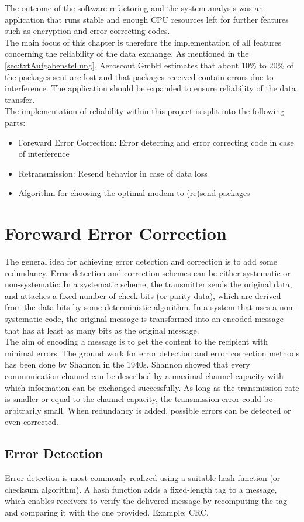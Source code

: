 %
The outcome of the software refactoring and the system analysis was an application that runs stable and enough CPU resources left for further features such as encryption and error correcting codes.\\
The main focus of this chapter is therefore the implementation of all features concerning the reliability of the data exchange. As mentioned in the \autoref{sec:txtAufgabenstellung}, Aeroscout GmbH estimates that about 10\% to 20\% of the packages sent are lost and that packages received contain errors due to interference. The application should be expanded to ensure reliability of the data transfer.\\
The implementation of reliability within this project is split into the following parts:
\begin{itemize}
    \item Foreward Error Correction: Error detecting and error correcting code in case of interference
    \item Retransmission: Resend behavior in case of data loss
    \item Algorithm for choosing the optimal modem to (re)send packages
\end{itemize}
%
%
%
%
%
\section{Foreward Error Correction}
The general idea for achieving error detection and correction is to add some redundancy. Error-detection and correction schemes can be either systematic or non-systematic: In a systematic scheme, the transmitter sends the original data, and attaches a fixed number of check bits (or parity data), which are derived from the data bits by some deterministic algorithm. In a system that uses a non-systematic code, the original message is transformed into an encoded message that has at least as many bits as the original message.\\
The aim of encoding a message is to get the content to the recipient with minimal errors. The ground work for error detection and error correction methods has been done by Shannon in the 1940s. Shannon showed that every communication channel can be described by a maximal channel capacity with which information can be exchanged successfully. As long as the transmission rate is smaller or equal to the channel capacity, the transmission error could be arbitrarily small. When redundancy is added, possible errors can be detected or even corrected.
%
%
\subsection{Error Detection}
Error detection is most commonly realized using a suitable hash function (or checksum algorithm). A hash function adds a fixed-length tag to a message, which enables receivers to verify the delivered message by recomputing the tag and comparing it with the one provided. Example: CRC.\cite{ErrorDetectionAndCorrection_Wikipedia}
%
%
